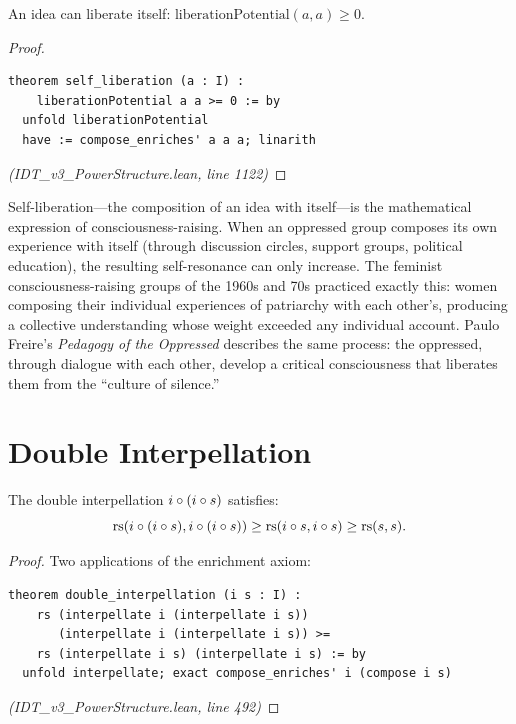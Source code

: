 \begin{theorem}
\label{thm:self-liberation}
An idea can liberate itself: $\mathrm{liberationPotential}(a, a) \geq 0$.
\end{theorem}

\begin{proof}
\begin{lstlisting}
theorem self_liberation (a : I) :
    liberationPotential a a >= 0 := by
  unfold liberationPotential
  have := compose_enriches' a a a; linarith
\end{lstlisting}
\textit{(IDT\_v3\_PowerStructure.lean, line 1122)}
\end{proof}

\begin{interpretation}
Self-liberation---the composition of an idea with itself---is the mathematical
expression of consciousness-raising. When an oppressed group composes its
own experience with itself (through discussion circles, support groups, political
education), the resulting self-resonance can only increase. The feminist
consciousness-raising groups of the 1960s and 70s practiced exactly this:
women composing their individual experiences of patriarchy with each other's,
producing a collective understanding whose weight exceeded any individual
account. Paulo Freire's \emph{Pedagogy of the Oppressed} describes the same
process: the oppressed, through dialogue with each other, develop a critical
consciousness that liberates them from the ``culture of silence.''
\end{interpretation}

\section{Double Interpellation}

\begin{theorem}
\label{thm:double-interpellation}
The double interpellation $i \circ (i \circ s)$ satisfies:
\[
  \mathrm{rs}(i \circ (i \circ s), i \circ (i \circ s)) \geq \mathrm{rs}(i \circ s, i \circ s) \geq \mathrm{rs}(s, s).
\]
\end{theorem}

\begin{proof}
Two applications of the enrichment axiom:
\begin{lstlisting}
theorem double_interpellation (i s : I) :
    rs (interpellate i (interpellate i s))
       (interpellate i (interpellate i s)) >=
    rs (interpellate i s) (interpellate i s) := by
  unfold interpellate; exact compose_enriches' i (compose i s)
\end{lstlisting}
\textit{(IDT\_v3\_PowerStructure.lean, line 492)}
\end{proof}

